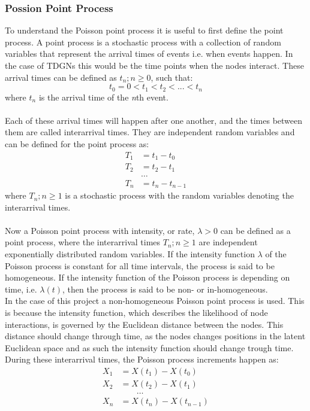 \subsubsection{Possion Point Process}
\label{sec:Method:Possion:PossionPointProcess}
To understand the Poisson point process it is useful to first define the point process. A point process is a stochastic process with a collection of random variables that represent the arrival times of events i.e. when events happen. In the case of TDGNs this would be the time points when the nodes interact. These arrival times can be defined as ${t_n ; n \ge 0}$, such that:
$$
t_0 = 0 < t_1 < t_2 < ... < t_n
$$
where $t_n$ is the arrival time of the \textit{n}th event.
\\\\
Each of these arrival times will happen after one another, and the times between them are called interarrival times. They are independent random variables and can be defined for the point process as:
\begin{align}
T_1 &= t_1 - t_0 \\
T_2 &= t_2 - t_1 \\
&\dots \\
T_n &= t_n - t_{n-1}
\end{align}
where ${T_n ; n \ge 1}$ is a stochastic process with the random variables denoting the interarrival times.
\\\\
Now a Poisson point process with intensity, or rate, $\lambda > 0$ can be defined as a point process, where the interarrival times ${T_n ; n \ge 1}$ are independent exponentially distributed random variables. If the intensity function $\lambda$ of the Poisson process is constant for all time intervals, the process is said to be homogeneous. If the intensity function of the Poisson process is depending on time, i.e. $\lambda(t)$, then the process is said to be non- or in-homogeneous.
\\
In the case of this project a non-homogeneous Poisson point process is used. This is because the intensity function, which describes the likelihood of node interactions, is governed by the Euclidean distance between the nodes. This distance should change through time, as the nodes changes positions in the latent Euclidean space and as such the intensity function should change trough time.\cite{Bas2019AProcess}
\\
During these interarrival times, the Poisson process increments happen as:
\begin{align}
X_1 &= X(t_1) - X(t_0) \\
X_2 &= X(t_2) - X(t_1) \\
&\;\;\;\;\;\;\;\dots \\
X_n &= X(t_n) - X(t_{n-1})
\end{align}
